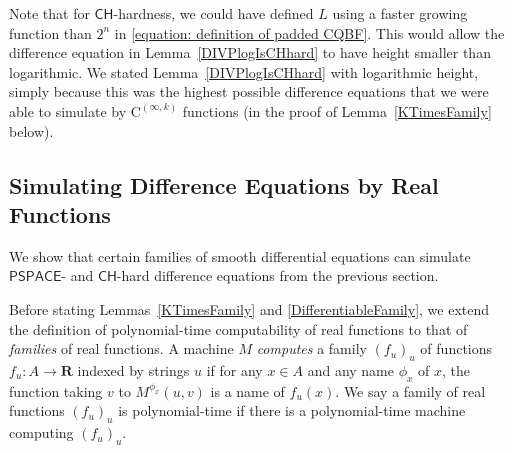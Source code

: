 \documentclass[12pt,a4paper]{article}
\theoremstyle{definition}
\theoremstyle{remark}
\newcommand{\R}{\mathbf R}
\newcommand{\classP}{\mathsf{P}}
\newcommand{\classPSPACE}{\mathsf{PSPACE}}
\newcommand{\classCH}{\mathsf{CH}}
\newcommand{\quantC}{\mathsf{C}}
\newcommand{\classC}{\mathrm C}
\begin{document}


Note that for $\classCH$-hardness, 
we could have defined $L$ using a faster growing function than $2 ^n$ in
\eqref{equation: definition of padded CQBF}. 
This would allow the difference equation in Lemma~\ref{DIVPlogIsCHhard}
to have height smaller than logarithmic. 
We stated Lemma~\ref{DIVPlogIsCHhard} with logarithmic height, 
simply because this was the highest possible difference equations
that we were able to simulate by $\classC ^{(\infty, k)}$ functions
(in the proof of Lemma~\ref{KTimesFamily} below). 

\subsection{Simulating Difference Equations by Real Functions}
\label{subsection: ode family}
We show that certain families of smooth differential equations can simulate 
$\classPSPACE$- and $\classCH$-hard difference equations from the previous section.

Before stating Lemmas~\ref{KTimesFamily} and \ref{DifferentiableFamily},
we extend the definition of polynomial-time computability of real functions
to that of \emph{families} of real functions.
A machine $M$ \emph{computes} a family $(f_u)_u$ of functions $f _u \colon A \to \R$ 
indexed by strings $u$
if for any $x \in A$ and any name $\phi_x$ of $x$,
the function taking $v$ to $M ^{\phi _x} (u, v)$ is a name of $f _u (x)$.
We say a family of real functions $(f_u)_u$ is polynomial-time if there is
a polynomial-time machine computing $(f_u)_u$.
\end{document}

